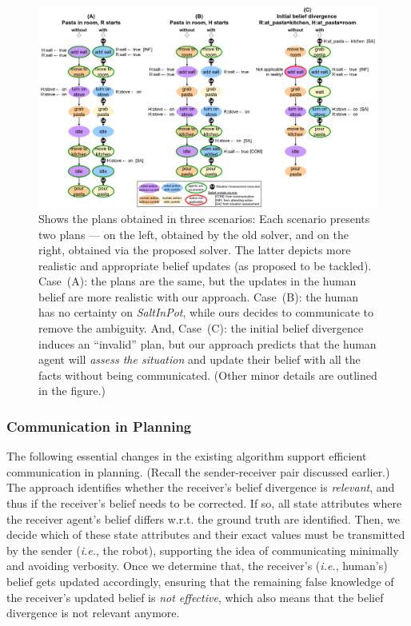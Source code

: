 \documentclass[letterpaper]{article} %
\begin{document}
\begin{figure}[!ht]
    \centering
    \includegraphics[width=0.78\linewidth]{figures/example_cook.png}
    \caption{
    Shows the plans obtained in three scenarios: Each scenario presents two plans --- on the left, obtained by the old solver, and on the right, obtained via the proposed solver. The latter depicts more realistic and appropriate belief updates (as proposed to be tackled).
    Case~(A): the plans are the same, but the updates in the human belief are more realistic with our approach. Case~(B): the human has no certainty on {\em SaltInPot}, while ours decides to communicate to remove the ambiguity. And, Case~(C): the initial belief divergence induces an ``invalid'' plan, but our approach predicts that the human agent will \textit{assess the situation} and update their belief with all the facts without being communicated. (Other minor details are outlined in the figure.)
    }
    \label{fig:scenarios}
\end{figure}

\subsubsection{Communication in Planning}
The following essential changes in the existing algorithm support efficient communication in planning. 
(Recall the sender-receiver pair discussed earlier.) The approach identifies whether the receiver's belief divergence is \textit{relevant}, and thus if the receiver's belief needs to be corrected.
If so, all state attributes where the receiver agent's belief differs w.r.t. the ground truth are identified. Then, we decide which of these state attributes and their exact values must be transmitted by the sender (\textit{i.e.}, the robot), supporting the idea of communicating minimally and avoiding verbosity. Once we determine that, the receiver's (\textit{i.e.}, human's) belief gets updated accordingly, ensuring that the remaining false knowledge of the receiver's updated belief is \textit{not effective}, which also means that the belief divergence is not relevant anymore. 
    
\end{document}
